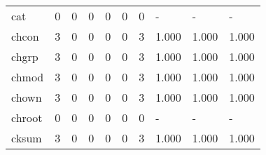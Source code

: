 \begin{longtable}{lp{1.3cm}p{1.3cm}p{1.3cm}p{1.3cm}p{1.3cm}p{1.3cm}p{1.3cm}p{1.3cm}p{1.3cm}}
cat       &                      0 &                                             0 &                                            0 &                                           0 &                                            0 &                                          0 &                                    - &                                      - &                                    - \\
chcon     &                      3 &                                             0 &                                            0 &                                           0 &                                            0 &                                          3 &                                1.000 &                                  1.000 &                                1.000 \\
chgrp     &                      3 &                                             0 &                                            0 &                                           0 &                                            0 &                                          3 &                                1.000 &                                  1.000 &                                1.000 \\
chmod     &                      3 &                                             0 &                                            0 &                                           0 &                                            0 &                                          3 &                                1.000 &                                  1.000 &                                1.000 \\
chown     &                      3 &                                             0 &                                            0 &                                           0 &                                            0 &                                          3 &                                1.000 &                                  1.000 &                                1.000 \\
chroot    &                      0 &                                             0 &                                            0 &                                           0 &                                            0 &                                          0 &                                    - &                                      - &                                    - \\
cksum     &                      3 &                                             0 &                                            0 &                                           0 &                                            0 &                                          3 &                                1.000 &                                  1.000 &                                1.000 \\

\end{longtable}
